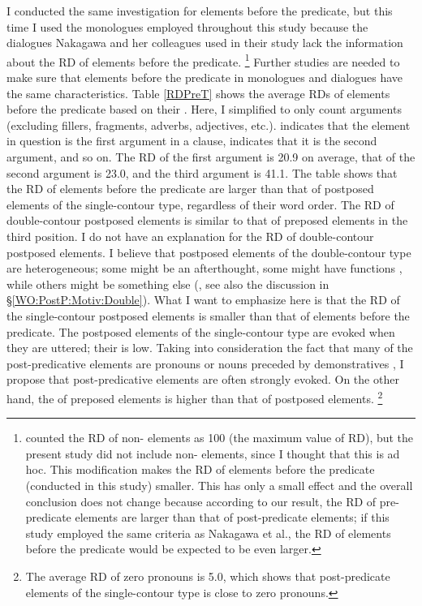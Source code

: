 I conducted the same investigation for elements before the predicate, but this time I used the monologues employed throughout this study
because the dialogues Nakagawa and her colleagues used in their study lack the information about the RD of elements before the predicate.%
	\footnote{
	 counted the RD of non- elements as 100 (the maximum value of RD),
	but the present study did not include non- elements,
	since I thought that this is ad hoc.
	This modification makes the RD of elements before the predicate (conducted in this study) smaller.
	This has only a small effect and the overall conclusion does not change because
	according to our result,
	the RD of pre-predicate elements are larger than that of post-predicate elements;
	if this study employed the same criteria as Nakagawa et al.,
	the RD of elements before the predicate would be expected to be even larger.
	}
Further studies are needed to make sure that elements before the predicate in monologues and dialogues have the same characteristics.
Table \ref{RDPreT} shows the average RDs of elements before the predicate based on their .
Here, I simplified  to only count arguments (excluding fillers, fragments, adverbs, adjectives, etc.).
 indicates that the element in question is the first argument in a clause,
 indicates that it is the second argument, and so on.
The RD of the first argument is 20.9 on average,
that of the second argument is 23.0, and
the third argument is 41.1.
The table shows that the RD of elements before the predicate are larger than that of postposed elements of the single-contour type, regardless of their word order.
The RD of double-contour postposed elements is similar to that of preposed elements in the third position.
I do not have an explanation for the RD of double-contour postposed elements.
I believe that postposed elements of the double-contour type are heterogeneous;
some might be an afterthought,
some might have  functions \cite{ono07},
while others might be something else (, see also the discussion in \S \ref{WO:PostP:Motiv:Double}).
What I want to emphasize here is that the RD of the single-contour postposed elements is smaller than that of elements before the predicate.
The postposed elements of the single-contour type are evoked when they are uttered;
their  is low.
Taking into consideration the fact that
many of the post-predicative elements are pronouns or nouns preceded by demonstratives \cite{nakagawaetal08_paper},
I propose that post-predicative elements are often strongly evoked.
On the other hand, the  of preposed elements is higher than that of postposed elements.%
 \footnote{
 The average RD of zero pronouns is 5.0,
 which shows that post-predicate elements of the single-contour type is
 close to zero pronouns.
 }

